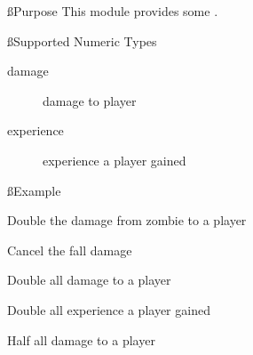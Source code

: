 \ss{Purpose}
This module provides some .

\ss{Supported Numeric Types}
\begin{description}
    \item [damage] damage to player
    \item[experience] experience a player gained
\end{description}

\ss{Example}
\begin{example}{Double the damage from zombie to a player}
\end{example}

\begin{example}{Cancel the fall damage}
\end{example}

\begin{example}{Double all damage to a player}
\end{example}

\begin{example}{Double all experience a player gained}
\end{example}

\begin{example}{Half all damage to a player}
\end{example}